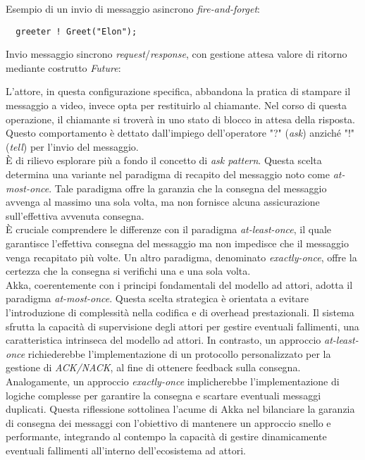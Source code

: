 Esempio di un invio di messaggio asincrono \textit{fire-and-forget}:

\begin{lstlisting}
  greeter ! Greet("Elon");
\end{lstlisting}

Invio messaggio sincrono \textit{request}/\textit{response}, con gestione attesa valore di ritorno mediante costrutto \textit{Future}:

 

L'attore, in questa configurazione specifica, abbandona la pratica di stampare il messaggio a video, invece opta per restituirlo al chiamante.
Nel corso di questa operazione, il chiamante si troverà in uno stato di blocco in attesa della risposta.
Questo comportamento è dettato dall'impiego dell'operatore "?" (\textit{ask}) anziché "!" (\textit{tell}) per l'invio del messaggio. \\
È di rilievo esplorare più a fondo il concetto di \textit{ask pattern}.
Questa scelta determina una variante nel paradigma di recapito del messaggio noto come \textit{at-most-once}.
Tale paradigma offre la garanzia che la consegna del messaggio avvenga al massimo una sola volta, ma non fornisce alcuna assicurazione sull'effettiva avvenuta consegna. \\
È cruciale comprendere le differenze con il paradigma \textit{at-least-once}, il quale garantisce l'effettiva consegna del messaggio ma non impedisce che il messaggio venga recapitato più volte.
Un altro paradigma, denominato \textit{exactly-once}, offre la certezza che la consegna si verifichi una e una sola volta. \\
Akka, coerentemente con i principi fondamentali del modello ad attori, adotta il paradigma \textit{at-most-once}.
Questa scelta strategica è orientata a evitare l'introduzione di complessità nella codifica e di overhead prestazionali.
Il sistema sfrutta la capacità di supervisione degli attori per gestire eventuali fallimenti, una caratteristica intrinseca del modello ad attori.
In contrasto, un approccio \textit{at-least-once} richiederebbe l'implementazione di un protocollo personalizzato per la gestione di \textit{ACK/NACK}, al fine di ottenere feedback sulla consegna.
Analogamente, un approccio \textit{exactly-once} implicherebbe l'implementazione di logiche complesse per garantire la consegna e scartare eventuali messaggi duplicati.
Questa riflessione sottolinea l'acume di Akka nel bilanciare la garanzia di consegna dei messaggi con l'obiettivo di mantenere un approccio snello e performante, integrando al contempo la capacità di gestire dinamicamente eventuali fallimenti all'interno dell'ecosistema ad attori.

